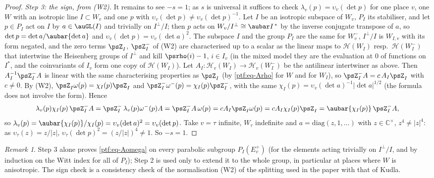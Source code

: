 \documentclass[10pt]{amsart}
\theoremstyle{definition}
\theoremstyle{remark}
\newtheorem{remark}[theorem]{Remark}
\newcommand{\C}{\mathbb C}
\providecommand{\psHS}{\mathcal H}
\begin{document}
\begin{proof}
\emph{Step 3: the sign, from (W2).} It remains to see $-s=1$; as $s$ is universal it suffices to check
$\lambda_v(p)=\upsilon_v(\det p)$ for one place $v$, one $W$ with an isotropic line $I\subset W_v$ and one
$p$ with $\upsilon_v(\det p)\neq\upsilon_v(\det p)^{-1}$. Let $I$ be an isotropic subspace of $W_v$, $P_I$ its
stabiliser, and let $p\in P_I$ act on $I$ by $a\in\auGL(I)$ and trivially on $I^\perp/I$; then $p$ acts on
$W_v/I^\perp\cong\aubar I^{\,*}$ by the inverse conjugate transpose of $a$, so $\det p=\det a/\aubar{\det a}$
and $\upsilon_v(\det p)=\upsilon_v(\det a)^2$. The subspace $I$ and the group $P_I$ are the same for
$W_v^-$, $I^\perp/I$ is $W_{I,v}$ with its form negated, and the zero terms $\psZ_I$, $\psZ^-_I$ of (W2)
are characterised up to a scalar as the linear maps to $\psHS(W_I)$ resp.\ $\psHS(W_I^-)$ that intertwine
the Heisenberg groups of $I^\perp$ and kill $\psrho(i)-1$, $i\in I_v$ (in the mixed model they are the
evaluation at $0$ of functions on $I^*$, and the coinvariants of $I_v$ form one copy of
$\psHS(W_I)$). Let $A_I\colon\psHS_v(W_I)\to\psHS_v(W_I^-)$ be the antilinear intertwiner as above. Then
$A_I^{-1}\psZ^-_IA$ is linear with the same characterising properties as $\psZ_I$ (by
\eqref{ptf:eq-Arho} for $W$ and for $W_I$), so $\psZ^-_IA=c\,A_I\psZ_I$ with $c\neq0$. By (W2), $\psZ_I
\omega(p)=\chi_I(p)\psZ_I$ and $\psZ^-_I\omega^-(p)=\chi_I(p)\psZ^-_I$, with the same
$\chi_I(p)=\upsilon_v(\det a)^{-1}|\det a|^{1/2}$ (the formula does not involve the form). Hence
\[
\lambda_v(p)\chi_I(p)\,\psZ^-_IA=\psZ^-_I\,\lambda_v(p)\omega^-(p)A=\psZ^-_IA\,\omega(p)=cA_I\psZ_I\omega(p)
=cA_I\chi_I(p)\psZ_I=\aubar{\chi_I(p)}\,\psZ^-_IA,
\]
so $\lambda_v(p)=\aubar{\chi_I(p)}/\chi_I(p)=\upsilon_v(\det a)^2=\upsilon_v(\det p)$. Take $v=\tau$ infinite,
$W_\tau$ indefinite and $a=\mathrm{diag}(z,1,\dots)$ with $z\in\C^\times$, $z^4\neq|z|^4$: as
$\upsilon_\tau(z)=z/|z|$, $\upsilon_\tau(\det p)^2=(z/|z|)^4\ne1$. So $-s=1$.
\end{proof}

\begin{remark}\label{ptf:rem-weil}
Step 3 alone proves \eqref{ptf:eq-Aomega} on every parabolic subgroup $P_I(E^+_v)$ (for the elements
acting trivially on $I^\perp/I$, and by induction on the Witt index for all of $P_I$); Step 2 is used
only to extend it to the whole group, in particular at places where $W$ is anisotropic. The sign check
is a consistency check of the normalisation (W2) of the splitting used in the paper with that of
Kudla.
\end{remark}
\end{document}
